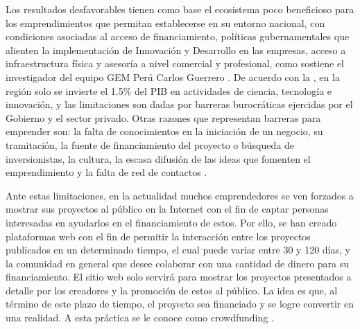 Los resultados desfavorables tienen como base el ecosistema poco beneficioso para los emprendimientos que permitan establecerse en su entorno nacional, con condiciones asociadas al acceso de financiamiento, políticas gubernamentales que alienten la implementación de Innovación y Desarrollo en las empresas, acceso a infraestructura física y asesoría a nivel comercial y profesional, como sostiene el investigador del equipo GEM Perú Carlos Guerrero \parencite{cr_gestion2018emprend}. De acuerdo con la \cite{cr_aep2018emprend}, en la región solo se invierte el 1.5\% del PIB en actividades de ciencia, tecnología e innovación, y las limitaciones son dadas por barreras burocráticas ejercidas por el Gobierno y el sector privado. Otras razones que representan barreras para emprender son: la falta de conocimientos en la iniciación de un negocio, su tramitación, la fuente de financiamiento del proyecto o búsqueda de inversionistas, la cultura, la escasa difusión de las ideas que fomenten el emprendimiento y la falta de red de contactos \parencite{cr_sandoval_barreras}.

Ante estas limitaciones, en la actualidad muchos emprendedores se ven forzados a mostrar sus proyectos al público en la Internet con el fin de captar personas interesadas en ayudarlos en el financiamiento de estos. Por ello, se han creado plataformas web con el fin de permitir la interacción entre los proyectos publicados en un determinado tiempo, el cual puede variar entre 30 y 120 días, y la comunidad en general que desee colaborar con una cantidad de dinero para su financiamiento. El sitio web solo servirá para mostrar los proyectos presentados a detalle por los creadores y la promoción de estos al público. La idea es que, al término de este plazo de tiempo, el proyecto sea financiado y se logre convertir en una realidad. A esta práctica se le conoce como crowdfunding \parencite{cr_uc_crowdfunding}.

